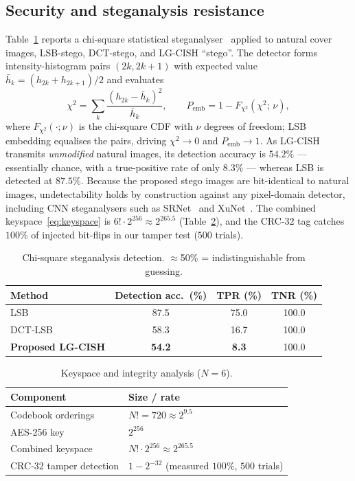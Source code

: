 \documentclass[10pt]{article}
\begin{document}
\subsection{Security and steganalysis resistance}
Table~\ref{tab:steg} reports a chi-square statistical steganalyser~\cite{westfeld1999}
applied to natural cover images, LSB-stego, DCT-stego, and LG-CISH ``stego''. The
detector forms intensity-histogram pairs $(2k,2k{+}1)$ with expected value
$\bar h_k=(h_{2k}+h_{2k+1})/2$ and evaluates
\begin{equation}
  \chi^2=\sum_{k}\frac{\left(h_{2k}-\bar h_k\right)^2}{\bar h_k},
  \qquad
  P_{\mathrm{emb}}=1-F_{\chi^2}\!\left(\chi^2;\,\nu\right),
  \label{eq:chi2}
\end{equation}
where $F_{\chi^2}(\cdot;\nu)$ is the chi-square CDF with $\nu$ degrees of freedom;
LSB embedding equalises the pairs, driving $\chi^2\!\to\!0$ and
$P_{\mathrm{emb}}\!\to\!1$. As LG-CISH transmits \emph{unmodified} natural images,
its detection accuracy is $54.2\%$ --- essentially chance, with a true-positive
rate of only $8.3\%$ --- whereas LSB is detected at $87.5\%$. Because the proposed
stego images are bit-identical to natural images, undetectability holds by
construction against any pixel-domain detector, including CNN steganalysers such
as SRNet~\cite{boroumand2019} and XuNet~\cite{xu2016}. The combined
keyspace~\eqref{eq:keyspace} is $6!\cdot2^{256}\approx2^{265.5}$
(Table~\ref{tab:keyspace}), and the CRC-32 tag catches $100\%$ of injected
bit-flips in our tamper test ($500$ trials).

\begin{table}[t]
\centering
\caption{Chi-square steganalysis detection. $\approx$50\% = indistinguishable from guessing.}\label{tab:steg}
\begin{tabular}{@{}lccc@{}}
\toprule
Method & Detection acc.\ (\%) & TPR (\%) & TNR (\%) \\
\midrule
LSB              & 87.5 & 75.0 & 100.0 \\
DCT-LSB          & 58.3 & 16.7 & 100.0 \\
\textbf{Proposed LG-CISH} & \textbf{54.2} & \textbf{8.3} & 100.0 \\
\bottomrule
\end{tabular}
\end{table}

\begin{table}[t]
\centering
\caption{Keyspace and integrity analysis ($N{=}6$).}\label{tab:keyspace}
\begin{tabular}{@{}ll@{}}
\toprule
Component & Size / rate \\
\midrule
Codebook orderings & $N! = 720 \approx 2^{9.5}$ \\
AES-256 key        & $2^{256}$ \\
Combined keyspace  & $N!\cdot2^{256} \approx 2^{265.5}$ \\
CRC-32 tamper detection & $1-2^{-32}$ (measured $100\%$, $500$ trials) \\
\bottomrule
\end{tabular}
\end{table}
\end{document}
